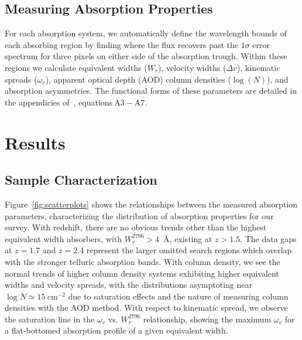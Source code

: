 \documentclass[iop,apj,numberedappendix,appendixfloats,twocolappendix]{emulateapj}
\begin{document}

\subsection{Measuring Absorption Properties}
\label{sec:measuring}

For each absorption system, we automatically define the wavelength bounds of each absorbing region by finding where the flux recovers past the $1\sigma$ error spectrum for three pixels on either side of the absorption trough. Within these regions we calculate equivalent widths ($W_r$), velocity widths ($\Delta v$), kinematic spreads ($\omega_v$), apparent optical depth (AOD) column densities ($\log(N)$), and absorption asymmetries. The functional forms of these parameters are detailed in the appendicies of~\cite{Churchill2001}, equations$~\mathrm{A3 - A7}$.



\section{Results}
\label{sec:results}

\subsection{Sample Characterization}
\label{sec:sample}

\begin{figure*}[bth]
\caption{Correlations between measured absorption properties for survey sample. $\log N$ is the AOD column density, $\omega_v$ is the kinematic spread, $W_r^{2796}$ is the rest frame {} equivalent width, and $z$ is the absorption redshift.}
\label{fig:scatterplots}
\end{figure*}

Figure~\ref{fig:scatterplots} shows the relationships between the measured absorption parameters, characterizing the distribution of absorption properties for our survey. With redshift, there are no obvious trends other than the highest equivalent width absorbers, with $W_r^{2796} > 4$~{\AA}, existing at $z > 1.5$. The data gaps at $z = 1.7$ and $z = 2.4$ represent the larger omitted search regions which overlap with the stronger telluric absorption bands. With column density, we see the normal trends of higher column density systems exhibiting higher equivalent widths and velocity spreads, with the distributions asymptoting near $\log N \simeq 15~\mathrm{cm^{-2}}$ due to saturation effects and the nature of measuring column densities with the AOD method. With respect to kinematic spread, we observe the saturation line in the $\omega_v$ vs. $W_r^{2796}$ relationship, showing the maximum $\omega_v$ for a flat-bottomed absorption profile of a given equivalent width.
\end{document}
